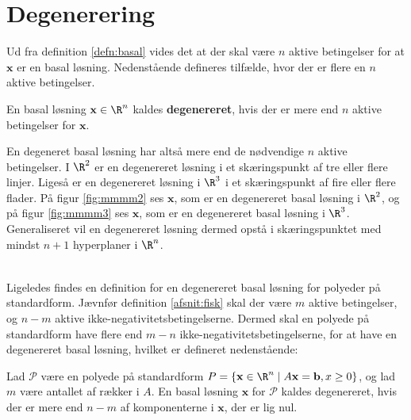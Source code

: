 \section{Degenerering}
Ud fra definition \ref{defn:basal} vides det at der skal være $n$ aktive betingelser for at $\mathbf{x}$ er en basal løsning. 
Nedenstående defineres tilfælde, hvor der er flere en $n$ aktive betingelser. 
%
\begin{defn}{}{}
En basal løsning $\mathbf{x} \in \R^n$ kaldes \textbf{degenereret}, hvis der er mere end $n$ aktive betingelser for $\mathbf{x}$.
\end{defn}
\noindent
%
En degeneret basal løsning har altså mere end de nødvendige $n$ aktive betingelser.
% 
I $\R^2$ er en degenereret løsning i et skæringspunkt af tre eller flere linjer. 
Ligeså er en degenereret løsning i $\R^3$ i et skæringspunkt af fire eller flere flader. 
På figur \ref{fig:mmmm2} ses $\mathbf{x}$, som er en degenereret basal løsning i $\R^2$, og på figur  \ref{fig:mmmm3} ses $\mathbf{x}$, som er en degenereret basal løsning i $\R^3$.
Generaliseret vil en degenereret løsning dermed opstå i skæringspunktet med mindst $n+1$ hyperplaner i $\R^n$.
%
%
\begin{center}
$
\begin{array}{cc}
&

\end{array}
$
\end{center}
%
%
Ligeledes findes en definition for en degenereret basal løsning for polyeder på standardform. 
Jævnfør definition \ref{afsnit:fisk} skal der være $m$ aktive betingelser, og $n-m$ aktive ikke-negativitetsbetingelserne. Dermed skal en polyede på standardform have flere end $m-n$ ikke-negativitetsbetingelserne, for at have en degenereret basal løsning, hvilket er defineret nedenstående:
%
\begin{defn}{}{}
Lad $\mathcal{P}$ være en polyede på standardform
$P=\{ \mathbf{x} \in \R^n \mid A \mathbf{x}=\mathbf{b},x \geq 0 \}$, og lad $m$ være antallet af rækker i $A$.
En basal løsning $\mathbf{x}$ for $\mathcal{P}$ kaldes degenereret, hvis der er mere end $n-m$ af komponenterne i $\mathbf{x}$, der er lig nul.
\end{defn}
%
